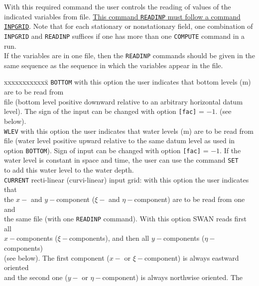 \documentclass[12pt]{book}
\begin{document}
\noindent
With this required command the user controls the reading of values of the indicated variables from file.
\underline{This command {\tt READINP} must follow a command {\tt INPGRID}}. Note that for each stationary or nonstationary
field, one combination of {\tt INPGRID} and {\tt READINP} suffices if one has more than one {\tt COMPUTE} command in a run.
\\[2ex]
\noindent
If the variables are in one file, then the {\tt READINP} commands should be given in the same sequence as the sequence in
which the variables appear in the file.
\begin{tabbing}
xxxxxxxxxxxx\= \kill
{\tt BOTTOM}        \> with this option the user indicates that bottom levels (m) are to be read from\+\\
                       file (bottom level positive downward relative to an arbitrary horizontal datum\\
                       level). The sign of the input can be changed with option {\tt [fac]} = $-1$. (see below).\-\\
{\tt WLEV}          \> with this option the user indicates that water levels (m) are to be read from\+\\
                       file (water level positive upward relative to the same datum level as used in\\
                       option {\tt BOTTOM}). Sign of input can be changed with option {\tt [fac]} = $-1$. If the\\
                       water level is constant in space and time, the user can use the command {\tt SET}\\
                       to add this water level to the water depth.\-\\
{\tt CURRENT}       \> recti-linear (curvi-linear) input grid: with this option the user indicates that\+\\
                       the $x-$ and $y-$component ($\xi-$ and $\eta-$component) are to be read from one and\\
                       the same file (with one {\tt READINP} command). With this option SWAN reads first all\\
                       $x-$components ($\xi-$components), and then all $y-$components ($\eta-$components)\\
                       (see below). The first component ($x-$ or $\xi-$component) is always eastward oriented\\
                       and the second one ($y-$ or $\eta-$component) is always northwise oriented. The\\

\end{tabbing}
\end{document}
